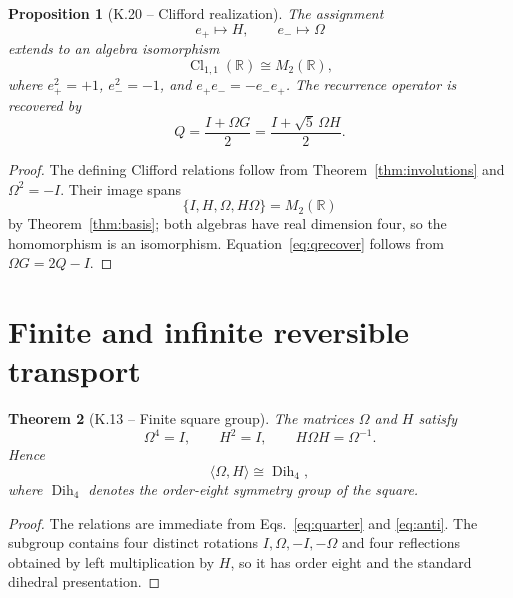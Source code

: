 \documentclass[11pt,letterpaper]{article}
\theoremstyle{kernelstyle}
\newtheorem{theorem}{Theorem}[section]
\newtheorem{proposition}[theorem]{Proposition}
\newcommand{\R}{\mathbb{R}}
\newcommand{\Dih}{\operatorname{Dih}}
\newcommand{\Cl}{\operatorname{Cl}}
\begin{document}
\begin{proposition}[K.20 -- Clifford realization]\label{prop:clifford}
The assignment
\begin{equation}
 e_+\longmapsto H,
 \qquad
 e_-\longmapsto\Omega
\end{equation}
extends to an algebra isomorphism
\begin{equation}
\Cl_{1,1}(\R)\cong M_2(\R),
\end{equation}
where $e_+^2=+1$, $e_-^2=-1$, and $e_+e_-=-e_-e_+$.  The recurrence operator is recovered by
\begin{equation}\label{eq:qrecover}
Q=\frac{I+\Omega G}{2}
=\frac{I+\sqrt5\,\Omega H}{2}.
\end{equation}
\end{proposition}

\begin{proof}
The defining Clifford relations follow from Theorem~\ref{thm:involutions} and $\Omega^2=-I$.  Their image spans
\[
\{I,H,\Omega,H\Omega\}=M_2(\R)
\]
by Theorem~\ref{thm:basis}; both algebras have real dimension four, so the homomorphism is an isomorphism.  Equation~\eqref{eq:qrecover} follows from $\Omega G=2Q-I$.
\end{proof}

\section{Finite and infinite reversible transport}\label{sec:groups}

\begin{theorem}[K.13 -- Finite square group]\label{thm:d4}
The matrices $\Omega$ and $H$ satisfy
\begin{equation}
\Omega^4=I,
\qquad
H^2=I,
\qquad
H\Omega H=\Omega^{-1}.
\end{equation}
Hence
\begin{equation}
\langle\Omega,H\rangle\cong\Dih_4,
\end{equation}
where $\Dih_4$ denotes the order-eight symmetry group of the square.
\end{theorem}

\begin{proof}
The relations are immediate from Eqs.~\eqref{eq:quarter} and \eqref{eq:anti}.  The subgroup contains four distinct rotations $I,\Omega,-I,-\Omega$ and four reflections obtained by left multiplication by $H$, so it has order eight and the standard dihedral presentation.
\end{proof}
\end{document}
